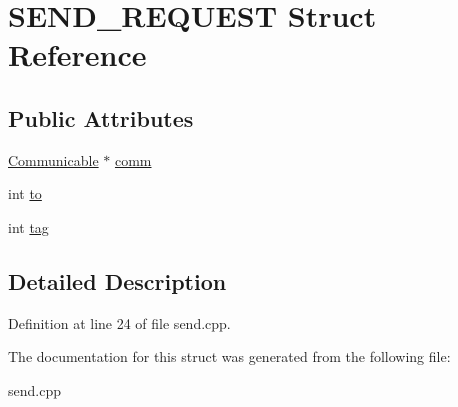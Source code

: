 \hypertarget{structSEND__REQUEST}{
\section{SEND\_\-REQUEST Struct Reference}
\label{structSEND__REQUEST}
}
\subsection*{Public Attributes}
\begin{CompactItemize}
\item 
\hypertarget{structSEND__REQUEST_1ad8f7233fa3ff13262e783a9153920f}{
\hyperlink{classCommunicable}{Communicable} $\ast$ \hyperlink{structSEND__REQUEST_1ad8f7233fa3ff13262e783a9153920f}{comm}}
\label{structSEND__REQUEST_1ad8f7233fa3ff13262e783a9153920f}

\item 
\hypertarget{structSEND__REQUEST_93e2a6a71d2a91aa2b7bdd050ee59b4d}{
int \hyperlink{structSEND__REQUEST_93e2a6a71d2a91aa2b7bdd050ee59b4d}{to}}
\label{structSEND__REQUEST_93e2a6a71d2a91aa2b7bdd050ee59b4d}

\item 
\hypertarget{structSEND__REQUEST_3126b3ef9d6533d3086760e413a7f23f}{
int \hyperlink{structSEND__REQUEST_3126b3ef9d6533d3086760e413a7f23f}{tag}}
\label{structSEND__REQUEST_3126b3ef9d6533d3086760e413a7f23f}

\end{CompactItemize}


\subsection{Detailed Description}




Definition at line 24 of file send.cpp.

The documentation for this struct was generated from the following file:\begin{CompactItemize}
\item 
send.cpp\end{CompactItemize}
